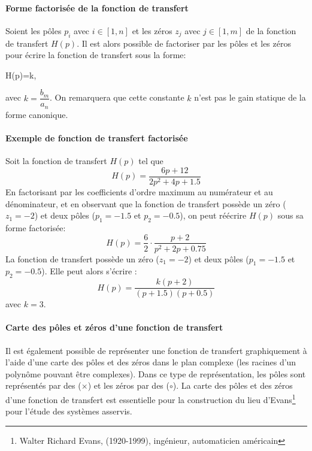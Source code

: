 \paragraph{Forme factorisée de la fonction de transfert}
Soient les pôles $p_i$ avec $i\in[1,n]$ et les zéros $z_j$ 
avec $j\in[1,m]$ de la fonction de transfert $H(p)$. 
Il est alors possible de factoriser par les pôles et les zéros pour écrire la fonction de 
transfert sous la forme:
\begin{bequation}
H(p)=k\cdot{},
\end{bequation}
avec $k=\dfrac{b_m}{a_n}$. On remarquera que cette constante $k$ 
n'est pas le gain statique de la forme canonique.

\paragraph{Exemple de fonction de transfert factorisée}

Soit la fonction de transfert $H(p)$ tel que
$$
H(p)=\dfrac{6p+12}{2p^2+4p+1.5}	
$$
En factorisant par les coefficients d'ordre maximum au numérateur et au dénominateur, et en observant 
que la fonction de transfert possède un zéro ($z_1=-2$) et deux pôles ($p_1=-1.5$ et $p_2=-0.5$), 
on peut réécrire $H(p)$ sous sa forme factorisée:
$$
H(p)=\dfrac{6}{2}\cdot\dfrac{p+2}{p^2+2p+0.75}
$$
La fonction de transfert possède un zéro ($z_1=-2$) et deux pôles ($p_1=-1.5$ et $p_2=-0.5$).
Elle peut alors s'écrire :
$$
H(p)=\dfrac{k(p+2)}{(p+1.5)(p+0.5)}
$$
avec $k=3$.
	
\paragraph{Carte des pôles et zéros d'une fonction de transfert}

Il est également possible de représenter une fonction de transfert graphiquement à 
l'aide d'une carte des pôles et des zéros dans le plan complexe (les racines d'un polynôme 
pouvant être complexes). Dans ce type de représentation, les pôles 
sont représentés par des ($\times$) et les zéros par des ($\circ$).
La carte des pôles et des zéros d'une fonction de transfert est essentielle 
pour la construction du lieu d'Evans\footnote{Walter Richard Evans, (1920-1999), 
ingénieur, automaticien américain} pour l'étude des systèmes asservis.

